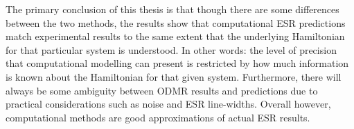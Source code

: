 \documentclass[oneside, noacknowlegments]{BYUPhys}
\begin{document}
The primary conclusion of this thesis is that though there are some differences between the two methods, the results show that computational ESR predictions match experimental results to the same extent that the underlying Hamiltonian for that particular system is understood. In other words: the level of precision that computational modelling can present is restricted by how much information is known about the Hamiltonian for that given system. Furthermore, there will always be some ambiguity between ODMR results and predictions due to practical considerations such as noise and ESR line-widths. Overall however, computational methods are good approximations of actual ESR results.







\printindex
\end{document}
